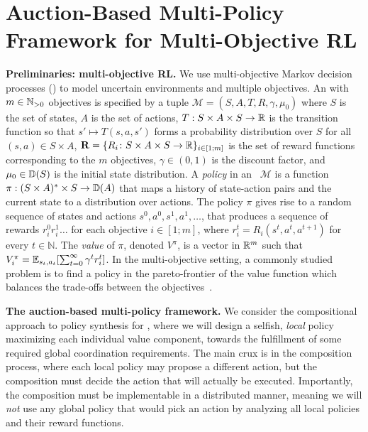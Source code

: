 \section{Auction-Based Multi-Policy Framework for Multi-Objective RL}

\textbf{Preliminaries: multi-objective RL.}
We use multi-objective Markov decision processes (\momdp) to model uncertain environments and multiple objectives. 
An \momdp with \(m \in \mathbb{N}_{>0}\) objectives is specified by a tuple \(\mathcal{M} = (S, A, T, R, \gamma, \mu_0)\) where \(S\) is the set of states, \(A\) is the set of actions, \(T : S \times A \times S \to \mathbb{R}\) is the transition function so that \(s' \mapsto T(s, a, s')\) forms a probability distribution over \(S\) for all \((s,a) \in S \times A\), \(\mathbf{R}=\{R_i \colon S \times A \times S \to \mathbb{R}\}_{i\in [1;m]}\) is the set of reward functions corresponding to the \(m\) objectives, $\gamma\in (0,1)$ is the discount factor, and \(\mu_0 \in \mathbb{D}(S)\) is the initial state distribution. 
A \textit{policy} in an \momdp~\(\mathcal{M}\) is a function \(\pi : (S \times A)^* \times S \to \mathbb{D}(A)\) that maps a history of state-action pairs and the current state to a distribution over actions.
The policy $\pi$ gives rise to a random sequence of states and actions $s^0,a^0,s^1,a^1,\ldots$, that produces a sequence of rewards $r^0_ir^1_i\ldots$ for each objective $i\in [1;m]$, where $r^t_i = R_i(s^t,a^t,a^{t+1})$ for every $t\in \mathbb{N}$.
The \textit{value} of $\pi$, denoted $V^\pi$, is a vector in $\mathbb{R}^m$ such that $V^\pi_i = \mathbb{E}_{s_t,a_t}[ \sum_{t=0}^\infty \gamma^t r^t_i]$.
In the multi-objective setting, a commonly studied problem is to find a policy in the pareto-frontier of the value function which balances the trade-offs between the objectives~\citep{van2014multi}.

\textbf{The auction-based multi-policy framework.}
We consider the compositional approach to policy synthesis for \momdps, where we will design a selfish, \emph{local} policy maximizing each individual value component, towards the fulfillment of some required global coordination requirements.
The main crux is in the composition process, where each local policy may propose a different action, but the composition must decide the action that will actually be executed.
Importantly, the composition must be implementable in a distributed manner, meaning we will \emph{not} use any global policy that would pick an action by analyzing all local policies and their reward functions.

